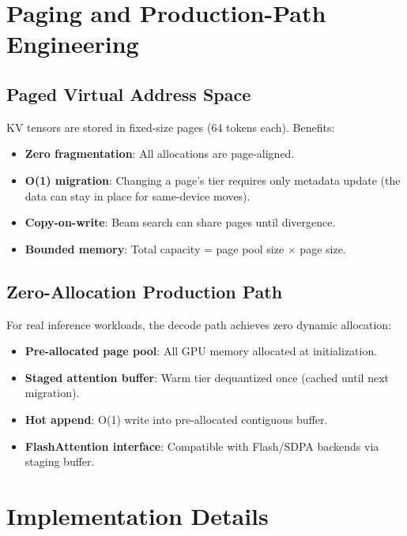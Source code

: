 \documentclass[11pt,a4paper]{article}
\begin{document}
\appendix

\section{Paging and Production-Path Engineering}
\label{app:engineering}

\subsection{Paged Virtual Address Space}

KV tensors are stored in fixed-size pages (64 tokens each). Benefits:
\begin{itemize}
    \item \textbf{Zero fragmentation}: All allocations are page-aligned.
    \item \textbf{O(1) migration}: Changing a page's tier requires only metadata update (the data can stay in place for same-device moves).
    \item \textbf{Copy-on-write}: Beam search can share pages until divergence.
    \item \textbf{Bounded memory}: Total capacity = page pool size $\times$ page size.
\end{itemize}

\subsection{Zero-Allocation Production Path}

For real inference workloads, the decode path achieves zero dynamic allocation:
\begin{itemize}
    \item \textbf{Pre-allocated page pool}: All GPU memory allocated at initialization.
    \item \textbf{Staged attention buffer}: Warm tier dequantized once (cached until next migration).
    \item \textbf{Hot append}: O(1) write into pre-allocated contiguous buffer.
    \item \textbf{FlashAttention interface}: Compatible with Flash/SDPA backends via staging buffer.
\end{itemize}

\section{Implementation Details}
\label{app:implementation}
\end{document}
